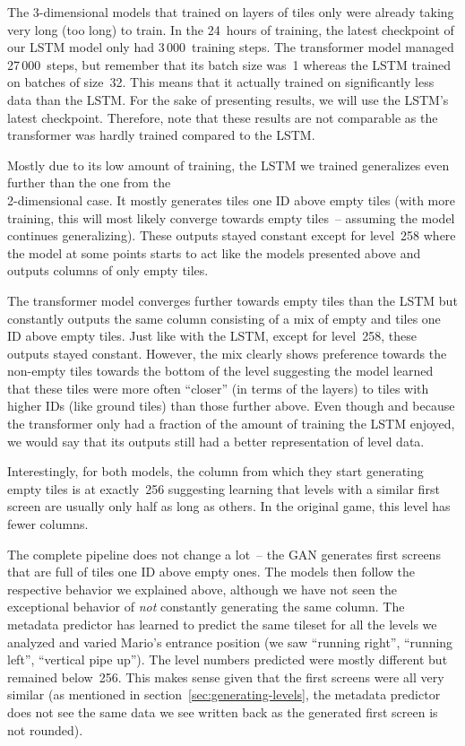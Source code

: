 The 3-dimensional models that trained on layers of tiles only were
already taking very long (too long) to train. In the 24~hours of
training, the latest checkpoint of our LSTM model only had
3\,000~training steps. The transformer model managed \\
27\,000~steps, but remember that its batch size was~1 whereas the LSTM
trained on batches of size~32. This means that it actually trained on
significantly less data than the LSTM. For the sake of presenting
results, we will use the LSTM's latest checkpoint. Therefore, note
that these results are not comparable as the transformer was hardly
trained compared to the LSTM.

Mostly due to its low amount of training, the LSTM we trained
generalizes even further than the one from the \\
2-dimensional case. It mostly generates tiles one ID above empty tiles
(with more training, this will most likely converge towards empty
tiles~-- assuming the model continues generalizing). These outputs
stayed constant except for level~258 where the model at some points
starts to act like the models presented above and outputs columns of
only empty tiles.

The transformer model converges further towards empty tiles than the
LSTM but constantly outputs the same column consisting of a mix of
empty and tiles one ID above empty tiles. Just like with the LSTM,
except for level~258, these outputs stayed constant. However, the mix
clearly shows preference towards the non-empty tiles towards the
bottom of the level suggesting the model learned that these tiles were
more often ``closer'' (in terms of the layers) to tiles with higher
IDs (like ground tiles) than those further above. Even though and
because the transformer only had a fraction of the amount of training
the LSTM enjoyed, we would say that its outputs still had a better
representation of level data.

Interestingly, for both models, the column from which they start
generating empty tiles is at exactly~256 suggesting learning that
levels with a similar first screen are usually only half as long as
others. In the original game, this level has fewer columns.
\medskip

The complete pipeline does not change a lot~-- the GAN generates first
screens that are full of tiles one ID above empty ones. The models
then follow the respective behavior we explained above, although we
have not seen the exceptional behavior of \emph{not} constantly
generating the same column. The metadata predictor has learned to
predict the same tileset for all the levels we analyzed and varied
Mario's entrance position (we saw ``running right'', ``running left'',
``vertical pipe up''). The level numbers predicted were mostly
different but remained below~256. This makes sense given that the
first screens were all very similar (as mentioned in
section~\ref{sec:generating-levels}, the metadata predictor does not
see the same data we see written back as the generated first screen is
not rounded).


